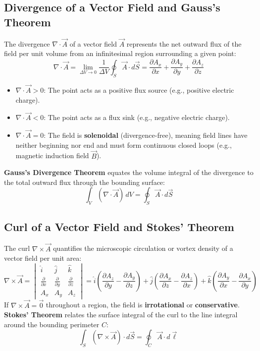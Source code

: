 \subsection{Divergence of a Vector Field and Gauss's Theorem}
The divergence $\nabla \cdot \vec{A}$ of a vector field $\vec{A}$ represents the net outward flux of the field per unit volume from an infinitesimal region surrounding a given point:
\begin{equation}
\nabla \cdot \vec{A} = \lim_{\Delta V \to 0} \frac{1}{\Delta V} \oint_S \vec{A} \cdot d\vec{S} = \frac{\partial A_x}{\partial x} + \frac{\partial A_y}{\partial y} + \frac{\partial A_z}{\partial z}
\end{equation}
\begin{itemize}[itemsep=2pt]
    \item $\nabla \cdot \vec{A} > 0$: The point acts as a positive flux source (e.g., positive electric charge).
    \item $\nabla \cdot \vec{A} < 0$: The point acts as a flux sink (e.g., negative electric charge).
    \item $\nabla \cdot \vec{A} = 0$: The field is \textbf{solenoidal} (divergence-free), meaning field lines have neither beginning nor end and must form continuous closed loops (e.g., magnetic induction field $\vec{B}$).
\end{itemize}
\textbf{Gauss's Divergence Theorem} equates the volume integral of the divergence to the total outward flux through the bounding surface:
\begin{equation}
\int_V (\nabla \cdot \vec{A}) \, dV = \oint_S \vec{A} \cdot d\vec{S}
\end{equation}

\subsection{Curl of a Vector Field and Stokes' Theorem}
The curl $\nabla \times \vec{A}$ quantifies the microscopic circulation or vortex density of a vector field per unit area:
\begin{equation}
\nabla \times \vec{A} = \begin{vmatrix}
\hat{i} & \hat{j} & \hat{k} \\
\frac{\partial}{\partial x} & \frac{\partial}{\partial y} & \frac{\partial}{\partial z} \\
A_x & A_y & A_z
\end{vmatrix} = \hat{i}\left(\frac{\partial A_z}{\partial y} - \frac{\partial A_y}{\partial z}\right) + \hat{j}\left(\frac{\partial A_x}{\partial z} - \frac{\partial A_z}{\partial x}\right) + \hat{k}\left(\frac{\partial A_y}{\partial x} - \frac{\partial A_x}{\partial y}\right)
\end{equation}
If $\nabla \times \vec{A} = \vec{0}$ throughout a region, the field is \textbf{irrotational} or \textbf{conservative}. \textbf{Stokes' Theorem} relates the surface integral of the curl to the line integral around the bounding perimeter $C$:
\begin{equation}
\int_S (\nabla \times \vec{A}) \cdot d\vec{S} = \oint_C \vec{A} \cdot d\vec{\ell}
\end{equation}

